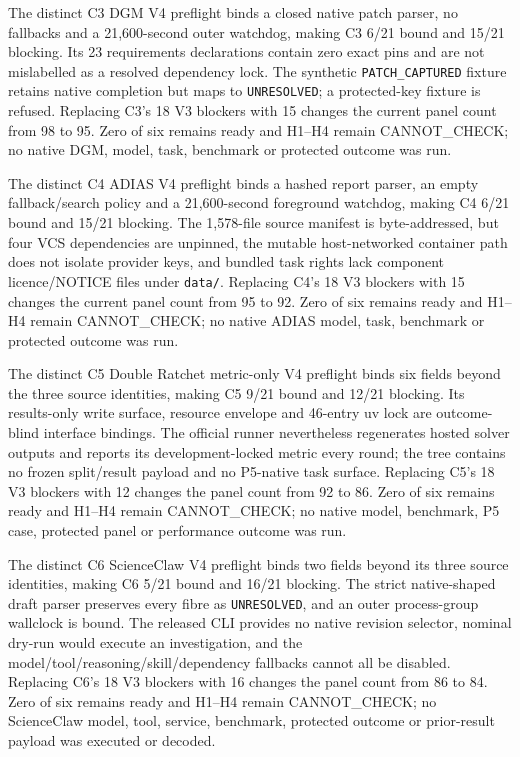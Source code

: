 The distinct C3 DGM V4 preflight binds a closed native patch parser, no
fallbacks and a 21,600-second outer watchdog, making C3 6/21 bound and 15/21
blocking. Its 23 requirements declarations contain zero exact pins and are not
mislabelled as a resolved dependency lock. The synthetic
\texttt{PATCH\_CAPTURED} fixture retains native completion but maps to
\texttt{UNRESOLVED}; a protected-key fixture is refused. Replacing C3's 18 V3
blockers with 15 changes the current panel count from 98 to 95. Zero of six
remains ready and H1--H4 remain \textsf{CANNOT\_CHECK}; no native DGM, model,
task, benchmark or protected outcome was run.

The distinct C4 ADIAS V4 preflight binds a hashed report parser, an empty
fallback/search policy and a 21,600-second foreground watchdog, making C4 6/21
bound and 15/21 blocking. The 1,578-file source manifest is byte-addressed, but
four VCS dependencies are unpinned, the mutable host-networked container path
does not isolate provider keys, and bundled task rights lack component
licence/NOTICE files under \texttt{data/}. Replacing C4's 18 V3 blockers with
15 changes the current panel count from 95 to 92. Zero of six remains ready and
H1--H4 remain \textsf{CANNOT\_CHECK}; no native ADIAS model, task, benchmark or
protected outcome was run.

The distinct C5 Double Ratchet metric-only V4 preflight binds six fields beyond
the three source identities, making C5 9/21 bound and 12/21 blocking. Its
results-only write surface, resource envelope and 46-entry uv lock are
outcome-blind interface bindings. The official runner nevertheless regenerates
hosted solver outputs and reports its development-locked metric every round;
the tree contains no frozen split/result payload and no P5-native task surface.
Replacing C5's 18 V3 blockers with 12 changes the panel count from 92 to 86.
Zero of six remains ready and H1--H4 remain \textsf{CANNOT\_CHECK}; no native
model, benchmark, P5 case, protected panel or performance outcome was run.

The distinct C6 ScienceClaw V4 preflight binds two fields beyond its three
source identities, making C6 5/21 bound and 16/21 blocking. The strict
native-shaped draft parser preserves every fibre as \texttt{UNRESOLVED}, and
an outer process-group wallclock is bound. The released CLI provides no native
revision selector, nominal dry-run would execute an investigation, and the
model/tool/reasoning/skill/dependency fallbacks cannot all be disabled.
Replacing C6's 18 V3 blockers with 16 changes the panel count from 86 to 84.
Zero of six remains ready and H1--H4 remain \textsf{CANNOT\_CHECK}; no
ScienceClaw model, tool, service, benchmark, protected outcome or prior-result
payload was executed or decoded.

